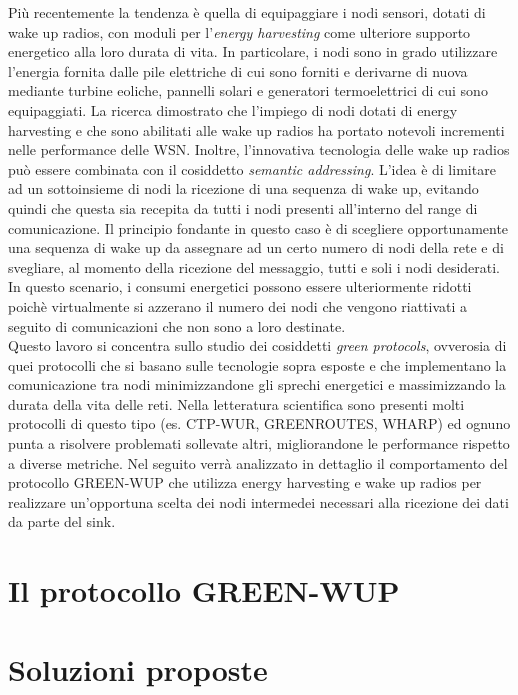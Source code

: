 \documentclass[binding=0.6cm,TFA]{sapthesis}
\begin{document}
Più recentemente la tendenza è quella di equipaggiare i nodi sensori, dotati di wake up radios, con moduli per l'\emph{energy harvesting} come ulteriore
supporto energetico alla loro durata di vita. In particolare, i nodi sono in grado utilizzare l'energia fornita dalle pile elettriche di cui sono
forniti e derivarne di nuova mediante turbine eoliche, pannelli solari e generatori termoelettrici di cui sono equipaggiati. La ricerca dimostrato che l'impiego
di nodi dotati di energy harvesting \cite{energy-harvesting-paper} e che sono abilitati alle wake up radios \cite{wake-up-radios-paper} ha portato notevoli
incrementi nelle performance delle WSN. Inoltre, l'innovativa tecnologia delle wake up radios può essere combinata con il cosiddetto \emph{semantic addressing}.
L'idea è di limitare ad un sottoinsieme di nodi la ricezione di una sequenza di wake up, evitando quindi che questa sia recepita da tutti i nodi presenti all'interno
del range di comunicazione. Il principio fondante in questo caso è di scegliere
opportunamente una sequenza di wake up da assegnare ad un certo numero di nodi della rete e di svegliare, al momento della ricezione del messaggio, tutti e soli i
nodi desiderati. In questo scenario, i consumi energetici possono essere ulteriormente ridotti poichè virtualmente si azzerano il numero dei nodi che vengono
riattivati a seguito di comunicazioni che non sono a loro destinate.\\

Questo lavoro si concentra sullo studio dei cosiddetti \emph{green protocols}, ovverosia di quei protocolli che si basano sulle tecnologie sopra esposte
e che implementano la comunicazione tra nodi minimizzandone gli sprechi energetici e massimizzando la durata della vita delle reti. Nella letteratura scientifica
sono presenti molti protocolli di questo tipo (es. CTP-WUR, GREENROUTES, WHARP) ed ognuno punta a risolvere problemati sollevate altri, migliorandone le performance
rispetto a diverse metriche. Nel seguito verrà analizzato in dettaglio il comportamento del protocollo GREEN-WUP che utilizza energy harvesting e
wake up radios per realizzare un'opportuna scelta dei nodi intermedei necessari alla ricezione dei dati da parte del sink.\\

\chapter{Il protocollo GREEN-WUP}
\chapter{Soluzioni proposte}
\end{document}
